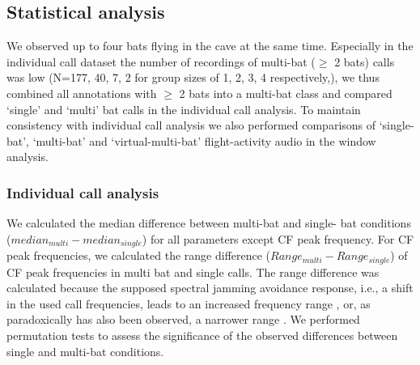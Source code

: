 \documentclass[
]{book}
\begin{document}
\hypertarget{statistical-analysis}{%
\subsection{Statistical analysis}\label{statistical-analysis}}

We observed up to four bats flying in the cave at the same time. Especially in the individual call dataset the number of recordings of multi-bat (\(\geq\) 2 bats) calls was low (N=177, 40, 7, 2 for group sizes of 1, 2, 3, 4 respectively,), we thus combined all annotations with \(\geq\) 2 bats into a multi-bat class and compared `single' and `multi' bat calls in the individual call analysis. To maintain consistency with individual call analysis we also performed comparisons of `single-bat', `multi-bat' and `virtual-multi-bat' flight-activity audio in the window analysis.

\hypertarget{indcallstatanalysis}{%
\subsubsection{Individual call analysis}\label{indcallstatanalysis}}

We calculated the median difference between multi-bat and single- bat conditions (\(median_{multi}-median_{single}\)) for all parameters except CF peak frequency. For CF peak frequencies, we calculated the range difference (\(Range_{multi}-Range_{single}\)) of CF peak frequencies in multi bat and single calls. The range difference was calculated because the supposed spectral jamming avoidance response, i.e., a shift in the used call frequencies, leads to an increased frequency range \citep{habersetzer1981adaptive}, or, as paradoxically has also been observed, a narrower range \citep{furusawa2012convergence}. We performed permutation tests to assess the significance of the observed differences between single and multi-bat conditions.
\end{document}

